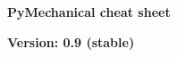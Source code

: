 \documentclass[9pt,landscape]{article}
\begin{document}
\raggedright
\footnotesize

\begin{center}
     \Huge{\textbf{PyMechanical cheat sheet}} \\
\end{center}

\begin{center}
  \small{\textbf{Version: 0.9 (stable)}} \\
\end{center}

\vspace{-0.15cm}
\noindent\makebox[\linewidth]{\rule{\paperwidth}{2pt}}
\end{document}

